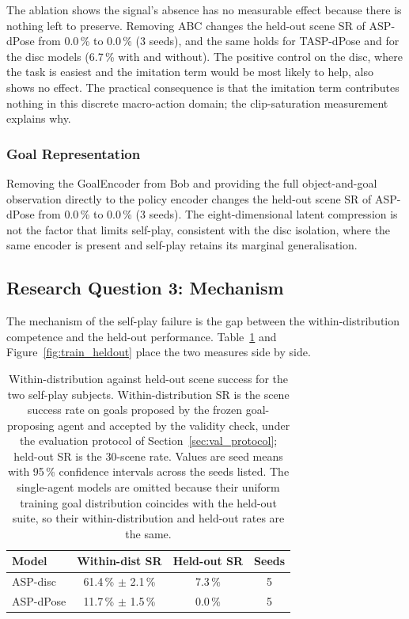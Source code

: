 The ablation shows the signal's absence has no measurable effect because there
is nothing left to preserve. Removing ABC changes the held-out scene SR of ASP-dPose from
0.0\,\% to 0.0\,\% (3 seeds), and the same holds for TASP-dPose and for the disc
models (6.7\,\% with and without). The positive control on the disc, where the
task is easiest and the imitation term would be most likely to help, also shows
no effect. The practical consequence is that the imitation term contributes
nothing in this discrete macro-action domain; the clip-saturation measurement
explains why.

\subsubsection{Goal Representation}
\label{sec:rq2_encoder}

Removing the GoalEncoder from Bob and providing the full object-and-goal
observation directly to the policy encoder changes the held-out scene SR of
ASP-dPose from 0.0\,\% to 0.0\,\% (3 seeds). The eight-dimensional latent
compression is not the factor that limits self-play, consistent with the disc
isolation, where the same encoder is present and self-play retains its marginal
generalisation.

\subsection{Research Question 3: Mechanism}
\label{sec:rq3}

The mechanism of the self-play failure is the gap between the within-distribution
competence and the held-out performance.
Table~\ref{tab:rq3} and Figure~\ref{fig:train_heldout} place the two measures
side by side.

\begin{table}[H]
    \centering
    \small
    \begin{tabular}{l c c c}
        \hline
        \textbf{Model} & \textbf{Within-dist SR} & \textbf{Held-out SR} & \textbf{Seeds} \\
        \hline
        ASP-disc     & 61.4\,\% $\pm$ 2.1\,\%  & 7.3\,\%          & 5 \\
        ASP-dPose    & 11.7\,\% $\pm$ 1.5\,\%  & 0.0\,\%          & 5 \\
        \hline
    \end{tabular}
    \caption{Within-distribution against held-out scene success for the two
    self-play subjects. Within-distribution SR is the scene success rate on goals
    proposed by the frozen goal-proposing agent and accepted by the validity
    check, under the evaluation protocol of Section~\ref{sec:val_protocol};
    held-out SR is the 30-scene rate. Values are seed means with 95\,\%
    confidence intervals across the seeds listed. The single-agent models are
    omitted because their uniform training goal distribution coincides with the
    held-out suite, so their within-distribution and held-out rates are the same.}
    \label{tab:rq3}
\end{table}

